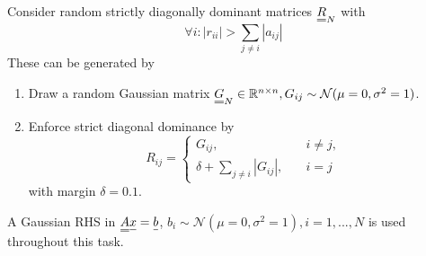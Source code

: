 
    Consider random strictly diagonally dominant matrices
    $\mat{R}_N$ with 
    \begin{equation}
        \forall i: |r_{ii}| > \sum_{j \neq i} |a_{ij}| 
    \end{equation}
    These can be generated by
    \begin{enumerate}
        \item Draw a random Gaussian matrix $\mat{G}_N \in \mathbb{R}^{n \times n}, G_{ij} \sim \mathcal{N}(\mu = 0,\sigma^2 = 1)$.
        \item Enforce strict diagonal dominance by
        \begin{equation}
            R_{ij} = \begin{cases}
                G_{ij}, \quad &i \neq j, \\
                \delta + \sum_{j \neq i} |G_{ij}|, \quad &i = j
            \end{cases}
        \end{equation}
    with margin $\delta = 0.1$.
    \end{enumerate}

    A Gaussian RHS in $\mat{A}\vec{x} = \vec{b}$, $b_i \sim \mathcal{N}(\mu = 0,\sigma^2 = 1), i = 1,...,N$ is used throughout this task.


